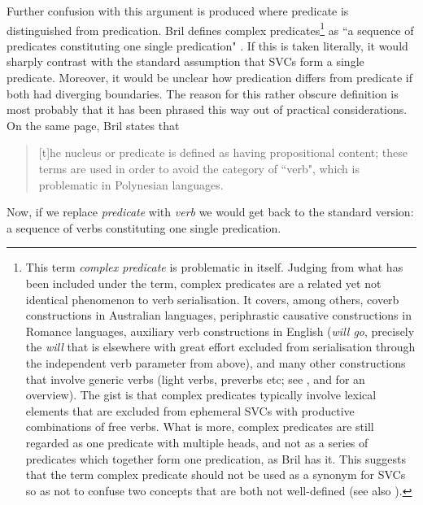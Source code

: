 Further confusion with this argument is produced where predicate is distinguished from predication. Bril defines complex predicates\footnote{This term \textit{complex predicate} is problematic in itself. Judging from what has been included under the term, complex predicates are a related yet not identical phenomenon to verb serialisation. It covers, among others, coverb constructions in Australian languages, periphrastic causative constructions in Romance languages, auxiliary verb constructions in English (\textit{will go}, precisely the \textit{will} that is elsewhere with great effort excluded from serialisation through the independent verb parameter from above), and many other constructions that involve generic verbs (light verbs, preverbs etc; see \citealt{alsina1997complex}, and \citealt{baker2010complex} for an overview). The gist is that complex predicates typically involve lexical elements that are excluded from ephemeral SVCs with productive combinations of free verbs. What is more, complex predicates are still regarded as one predicate with multiple heads, and not as a series of predicates which together form one predication, as Bril has it. This suggests that the term complex predicate should not be used as a synonym for SVCs so as not to confuse two concepts that are both not well-defined (see also \citealt[49]{butt2010light}).} as ``a sequence of predicates constituting one single predication" \citep[268]{bril2007nexus}. If this is taken literally, it would sharply contrast with the standard assumption that SVCs form a single predicate. Moreover, it would be unclear how predication differs from predicate if both had diverging boundaries. The reason for this rather obscure definition is most probably that it has been phrased this way out of practical considerations. On the same page, Bril states that \begin{quote}[t]he nucleus or predicate is defined as having propositional content; these terms are used in order to avoid the category of ``verb", which is problematic in Polynesian languages.\end{quote} Now, if we replace \textit{predicate} with \textit{verb} we would get back to the standard version: a sequence of verbs constituting one single predication. 

